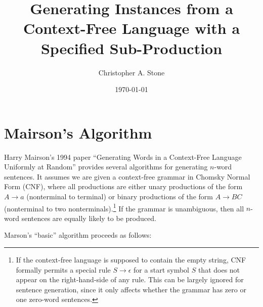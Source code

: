 \documentclass[10pt]{article}
\title{Generating Instances from a Context-Free Language with a Specified Sub-Production}
\author{Christopher A. Stone}
\date{\today}
\begin{document}
\maketitle

\section{Mairson's Algorithm}

Harry Mairson's 1994 paper ``Generating Words in a Context-Free Language Uniformly at Random'' provides several algorithms for generating $n$-word sentences. It assumes we are given a context-free grammar in Chomsky Normal Form (CNF), where all productions are either unary productions of the form $A\to a$ (nonterminal to terminal) or binary productions of the form $A\to BC$ (nonterminal to two nonterminals).\footnote{If the context-free language is supposed to contain the empty string, CNF formally permits a special rule $S\to\epsilon$ for a start symbol $S$ that does not appear on the right-hand-side of any rule. This can be largely ignored for sentence generation, since it only affects whether the grammar has zero or one zero-word sentences.}  If the grammar is unambiguous, then all $n$-word sentences are equally likely to be produced.

Marson's ``basic'' algorithm proceeds as follows:
\end{document}
